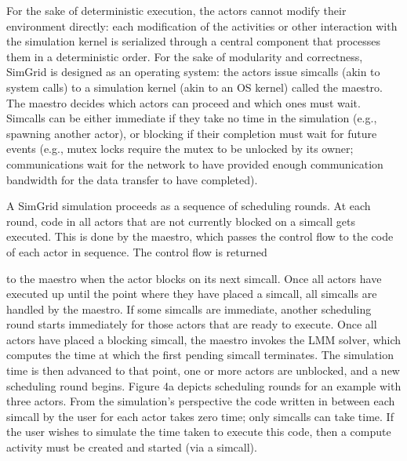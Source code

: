 \documentclass[
]{article}
\begin{document}
For the sake of deterministic execution, the actors cannot modify their
environment directly: each modification of the activities or other
interaction with the simulation kernel is serialized through a central
component that processes them in a deterministic order. For the sake of
modularity and correctness, SimGrid is designed as an operating system:
the actors issue simcalls (akin to system calls) to a simulation kernel
(akin to an OS kernel) called the maestro. The maestro decides which
actors can proceed and which ones must wait. Simcalls can be either
immediate if they take no time in the simulation (e.g., spawning another
actor), or blocking if their completion must wait for future events
(e.g., mutex locks require the mutex to be unlocked by its owner;
communications wait for the network to have provided enough
communication bandwidth for the data transfer to have completed).

A SimGrid simulation proceeds as a sequence of scheduling rounds. At
each round, code in all actors that are not currently blocked on a
simcall gets executed. This is done by the maestro, which passes the
control flow to the code of each actor in sequence. The control flow is
returned

to the maestro when the actor blocks on its next simcall. Once all
actors have executed up until the point where they have placed a
simcall, all simcalls are handled by the maestro. If some simcalls are
immediate, another scheduling round starts immediately for those actors
that are ready to execute. Once all actors have placed a blocking
simcall, the maestro invokes the LMM solver, which computes the time at
which the first pending simcall terminates. The simulation time is then
advanced to that point, one or more actors are unblocked, and a new
scheduling round begins. Figure 4a depicts scheduling rounds for an
example with three actors. From the simulation's perspective the code
written in between each simcall by the user for each actor takes zero
time; only simcalls can take time. If the user wishes to simulate the
time taken to execute this code, then a compute activity must be created
and started (via a simcall).
\end{document}
